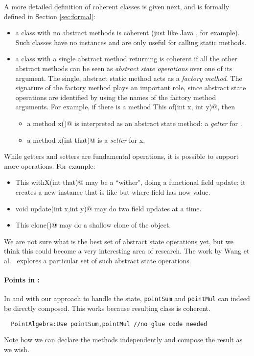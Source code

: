 A more detailed definition of coherent
classes is given next, and is formally defined in Section \ref{sec:formal}:
\begin{itemize}
\item a class with no abstract methods is coherent (just like Java
  \Q@Math@, for example). Such classes have no instances and are only useful for calling static methods.
\item a class with a single abstract \Q@static@ method returning \Q@This@
is coherent if all the other abstract methods can be seen as \emph{abstract state
operations} over one of its argument. The single, abstract static
method acts as a \emph{factory method}.
The signature of the factory method plays an important role, since
abstract state operations are identified by using the names of the
factory method arguments.
For example,
if there is a \Q@static method This of(int x, int y)@,
then
\begin{itemize}
\item a method \Q@int x()@ is interpreted as an abstract state method: a \emph{getter} for \Q@x@.
\item a method \Q@void x(int that)@ is a \emph{setter} for x.
\end{itemize}
\end{itemize}
\noindent
While getters and setters are fundamental operations, it is possible to
support more operations. For example:
\begin{itemize}
\item \Q@method This withX(int that)@
may be a ``wither", doing a functional field update: it creates a new instance that is like \Q@this@ but where field \Q@x@ has now \Q@that@ value.
\item \Q@method void update(int x,int y)@
may do two field updates at a time.
\item\Q@method This clone()@ may do a shallow clone of the object.
\end{itemize}

We are not sure what is the best set of abstract state operations yet,
but we think this could become a very interesting area of research.
The work by Wang et al.~\cite{wang2016classless} explores a particular
set of such abstract state operations.

\paragraph{Points in \name:}
In \name and with our approach to handle the state, 
\lstinline{pointSum} and \lstinline{pointMul} can indeed be directly composed.
This works because resulting class is coherent.
\saveSpace
\begin{lstlisting}
  PointAlgebra:Use pointSum,pointMul //no glue code needed
\end{lstlisting}  
\saveSpace
\noindent
  Note how we can declare the methods independently and compose the result
  as we wish. 

